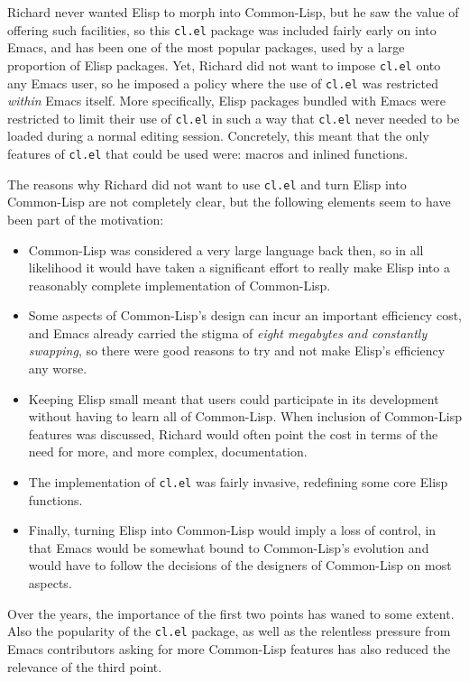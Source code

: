 \documentclass[format=acmsmall, review=false, screen=true]{acmart}
\newcommand \Elisp {Elisp}
\begin{document}
Richard never wanted \Elisp{} to morph into Common-Lisp, but he saw the
value of offering such facilities, so this \texttt{cl.el} package was
included fairly early on into Emacs, and has been one of the most popular
packages, used by a large proportion of \Elisp{} packages.  Yet, Richard did
not want to impose \texttt{cl.el} onto any Emacs user, so he imposed
a policy where the use of \texttt{cl.el} was restricted \emph{within} Emacs
itself.  More specifically, \Elisp{} packages bundled with Emacs were
restricted to limit their use of \texttt{cl.el} in such a way that
\texttt{cl.el} never needed to be loaded during a normal editing session.
Concretely, this meant that the only features of \texttt{cl.el} that could
be used were: macros and inlined functions.

The reasons why Richard did not want to use \texttt{cl.el} and turn \Elisp{}
into Common-Lisp are not completely clear, but the following elements seem
to have been part of the motivation:
\begin{itemize}
\item Common-Lisp was considered a very large language back then, so in all
  likelihood it would have taken a significant effort to really make
  \Elisp{} into a reasonably complete implementation of Common-Lisp.
\item Some aspects of Common-Lisp's design can incur an important efficiency
  cost, and Emacs already carried the stigma of \emph{eight megabytes and
    constantly swapping}, so there were good reasons to try and not make
  \Elisp{}'s efficiency any worse.
\item Keeping \Elisp{} small meant that users could participate in its
  development without having to learn all of Common-Lisp.  When inclusion of
  Common-Lisp features was discussed, Richard would often point the cost
  in terms of the need for more, and more complex, documentation.
\item The implementation of \texttt{cl.el} was fairly invasive, redefining
  some core \Elisp{} functions.
\item Finally, turning \Elisp{} into Common-Lisp would imply a loss of control,
  in that Emacs would be somewhat bound to Common-Lisp's evolution and would
  have to follow the decisions of the designers of Common-Lisp on most aspects.
\end{itemize}
Over the years, the importance of the first two points has waned to some
extent.  Also the popularity of the \texttt{cl.el} package, as well as the
relentless pressure from Emacs contributors asking for more Common-Lisp
features has also reduced the relevance of the third point.
\end{document}
